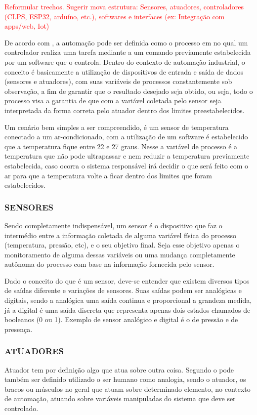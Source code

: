         \textcolor{red}{Reformular trechos. Sugerir mova estrutura: Sensores, atuadores, controladores (CLPS, ESP32, arduíno, etc.), softwares e interfaces (ex: Integração com apps/web, Iot)}
    
        De acordo com \cite{livroAutomacao}, a automação pode ser definida como o processo em no qual um controlador realiza uma tarefa mediante a um comando previamente estabelecida por um software que o controla. Dentro do contexto de automação industrial, o conceito é basicamente a utilização de dispositivos de entrada e saída de dados (sensores e atuadores), com suas variáveis de processos constantemente sob observação, a fim de garantir que o resultado desejado seja obtido, ou seja, todo o processo visa a garantia de que com a variável coletada pelo sensor seja interpretada da forma correta pelo atuador dentro dos limites preestabelecidos. 
        
        Um cenário bem simples a ser compreendido, é um sensor de temperatura conectado a um ar-condicionado, com a utilização de um software é estabelecido que a temperatura fique entre 22 e 27 graus. Nesse a variável de processo é a temperatura que não pode ultrapassar e nem reduzir a temperatura previamente estabelecida, caso ocorra o sistema responsável irá decidir o que será feito com o ar para que a temperatura volte a ficar dentro dos limites que foram estabelecidos.

        \subsubsection{SENSORES}
            Sendo completamente indispensável, um sensor é o dispositivo que faz o intermédio entre a informação coletada de alguma variável física do processo (temperatura, pressão, etc), e o seu objetivo final. Seja esse objetivo apenas o monitoramento de alguma dessas variáveis ou uma mudança completamente autônoma do processo com base na informação fornecida pelo sensor.

            Dado o conceito do que é um sensor, deve-se entender que existem diversos tipos de saídas diferente e variações de sensores. Suas saídas podem ser analógicas e digitais, sendo a analógica uma saída continua e proporcional a grandeza medida, já a digital é uma saída discreta que representa apenas dois estados chamados de booleanos (0 ou 1). Exemplo de sensor analógico e digital é o de pressão e de presença\cite{sensor}.
            
        \subsubsection{ATUADORES}
            Atuador tem por definição algo que atua sobre outra coisa. Segundo o \cite{atuadoresOutros} pode também ser definido utilizado o ser humano como analogia, sendo o atuador, os bracos ou músculos no geral que atuam sobre determinado elemento, no contexto de automação, atuando sobre variáveis manipuladas do sistema que deve ser controlado. 
            
